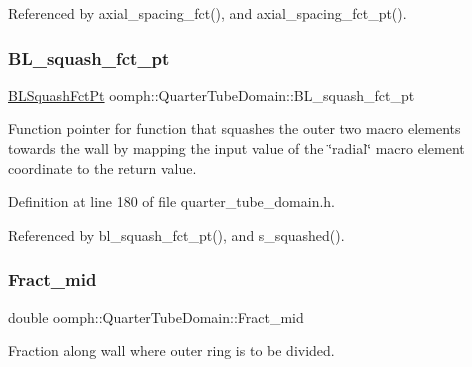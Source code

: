 Referenced by axial\+\_\+spacing\+\_\+fct(), and axial\+\_\+spacing\+\_\+fct\+\_\+pt().

\mbox{\label{classoomph_1_1QuarterTubeDomain_a2c55367b6f92fa1928326b8e0c62115b}} 
\subsubsection{\texorpdfstring{B\+L\+\_\+squash\+\_\+fct\+\_\+pt}{BL\_squash\_fct\_pt}}
{\footnotesize\ttfamily \hyperlink{classoomph_1_1QuarterTubeDomain_a3d8c15c17d9912d8c519c028437c0b2c}{B\+L\+Squash\+Fct\+Pt} oomph\+::\+Quarter\+Tube\+Domain\+::\+B\+L\+\_\+squash\+\_\+fct\+\_\+pt\hspace{0.3cm}{\ttfamily [private]}}



Function pointer for function that squashes the outer two macro elements towards the wall by mapping the input value of the \char`\"{}radial\char`\"{} macro element coordinate to the return value. 



Definition at line 180 of file quarter\+\_\+tube\+\_\+domain.\+h.



Referenced by bl\+\_\+squash\+\_\+fct\+\_\+pt(), and s\+\_\+squashed().

\mbox{\label{classoomph_1_1QuarterTubeDomain_aed92f9d08bf052a1575d4de159adfb7a}} 
\subsubsection{\texorpdfstring{Fract\+\_\+mid}{Fract\_mid}}
{\footnotesize\ttfamily double oomph\+::\+Quarter\+Tube\+Domain\+::\+Fract\+\_\+mid\hspace{0.3cm}{\ttfamily [private]}}



Fraction along wall where outer ring is to be divided. 



